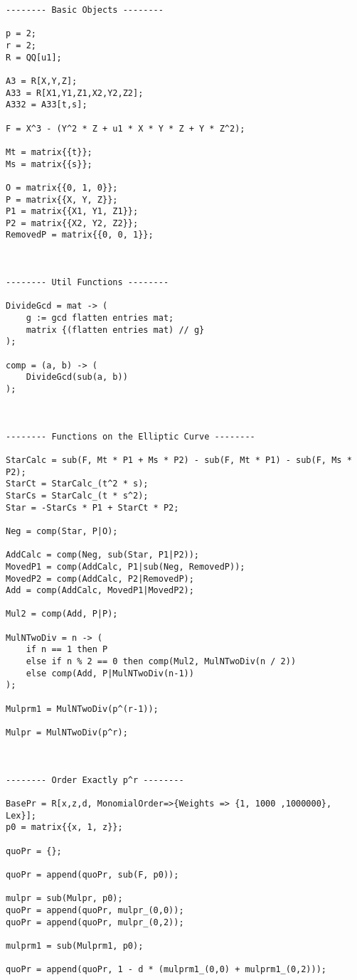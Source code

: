 \begin{lstlisting}
-------- Basic Objects --------

p = 2;
r = 2;
R = QQ[u1];

A3 = R[X,Y,Z];
A33 = R[X1,Y1,Z1,X2,Y2,Z2];
A332 = A33[t,s];

F = X^3 - (Y^2 * Z + u1 * X * Y * Z + Y * Z^2);

Mt = matrix{{t}};
Ms = matrix{{s}};

O = matrix{{0, 1, 0}};
P = matrix{{X, Y, Z}};
P1 = matrix{{X1, Y1, Z1}};
P2 = matrix{{X2, Y2, Z2}};
RemovedP = matrix{{0, 0, 1}};



-------- Util Functions --------

DivideGcd = mat -> (
	g := gcd flatten entries mat;
	matrix {(flatten entries mat) // g}
);

comp = (a, b) -> (
	DivideGcd(sub(a, b))
);



-------- Functions on the Elliptic Curve --------

StarCalc = sub(F, Mt * P1 + Ms * P2) - sub(F, Mt * P1) - sub(F, Ms * P2);
StarCt = StarCalc_(t^2 * s);
StarCs = StarCalc_(t * s^2);
Star = -StarCs * P1 + StarCt * P2;

Neg = comp(Star, P|O);

AddCalc = comp(Neg, sub(Star, P1|P2));
MovedP1 = comp(AddCalc, P1|sub(Neg, RemovedP));
MovedP2 = comp(AddCalc, P2|RemovedP);
Add = comp(AddCalc, MovedP1|MovedP2);

Mul2 = comp(Add, P|P);

MulNTwoDiv = n -> (
	if n == 1 then P
	else if n % 2 == 0 then comp(Mul2, MulNTwoDiv(n / 2))
	else comp(Add, P|MulNTwoDiv(n-1))
);

Mulprm1 = MulNTwoDiv(p^(r-1));

Mulpr = MulNTwoDiv(p^r);



-------- Order Exactly p^r --------

BasePr = R[x,z,d, MonomialOrder=>{Weights => {1, 1000 ,1000000}, Lex}];
p0 = matrix{{x, 1, z}};

quoPr = {};

quoPr = append(quoPr, sub(F, p0));

mulpr = sub(Mulpr, p0);
quoPr = append(quoPr, mulpr_(0,0));
quoPr = append(quoPr, mulpr_(0,2));

mulprm1 = sub(Mulprm1, p0);

quoPr = append(quoPr, 1 - d * (mulprm1_(0,0) + mulprm1_(0,2)));


\end{lstlisting}
